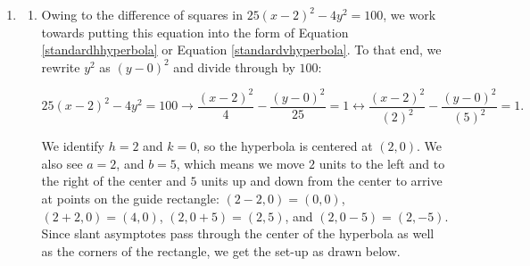 \documentclass{ximera}
\begin{document}
\begin{example}
\begin{enumerate}
\begin{enumerate}
\begin{image}

\end{image}


\end{enumerate}


\end{enumerate}

\begin{explanation}

\begin{enumerate}

\item

\begin{enumerate}

\item  Owing to the difference of squares in $25(x-2)^2 - 4y^2 = 100$, we work towards putting this equation into the form of  Equation \ref{standardhhyperbola} or Equation \ref{standardvhyperbola}. To that end, we rewrite $y^2$ as $(y-0)^2$ and divide through by $100$:

\[ 25(x-2)^2 - 4y^2 = 100 \rightarrow \frac{(x-2)^2}{4} - \frac{(y-0)^2}{25} = 1 \leftrightarrow \frac{(x-2)^2}{(2)^2} - \frac{(y-0)^2}{(5)^2} = 1. \]

We identify $h = 2$ and $k = 0$, so the hyperbola is centered at $(2,0)$.  We also see  $a = 2$, and  $b=5$, which means we move $2$ units to the  left and to the right of the center and $5$ units up and down from the center to arrive at points on the guide rectangle:   $(2-2, 0) = (0,0)$, $(2+2, 0) = (4,0)$, $(2, 0+5) = (2,5)$, and $(2, 0-5) = (2,-5)$.  Since slant asymptotes pass through the center of the hyperbola as well as the corners of the rectangle, we get the set-up as drawn below.


\end{enumerate}
\end{enumerate}
\end{explanation}
\end{example}
\end{document}
